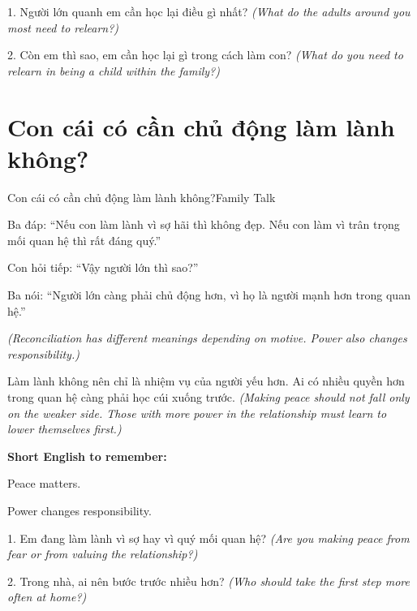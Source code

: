 \begin{tuhocnhanh}
1. Người lớn quanh em cần học lại điều gì nhất? \textit{(What do the adults around you most need to relearn?)}

2. Còn em thì sao, em cần học lại gì trong cách làm con? \textit{(What do you need to relearn in being a child within the family?)}
\end{tuhocnhanh}
\ngancach

\section{Con cái có cần chủ động làm lành không?}
\begin{truyen}{Con cái có cần chủ động làm lành không?}{Family Talk}

Ba đáp: ``Nếu con làm lành vì sợ hãi thì không đẹp. Nếu con làm vì trân trọng mối quan hệ thì rất đáng quý.''

Con hỏi tiếp: ``Vậy người lớn thì sao?''

Ba nói: ``Người lớn càng phải chủ động hơn, vì họ là người mạnh hơn trong quan hệ.''

\textit{(Reconciliation has different meanings depending on motive. Power also changes responsibility.)}
\end{truyen}

\begin{baihoc}
Làm lành không nên chỉ là nhiệm vụ của người yếu hơn. Ai có nhiều quyền hơn trong quan hệ càng phải học cúi xuống trước.
\textit{(Making peace should not fall only on the weaker side. Those with more power in the relationship must learn to lower themselves first.)}
\end{baihoc}

\begin{ghinhoanh}
\textbf{Short English to remember:}

Peace matters.

Power changes responsibility.
\end{ghinhoanh}

\begin{tuhocnhanh}
1. Em đang làm lành vì sợ hay vì quý mối quan hệ? \textit{(Are you making peace from fear or from valuing the relationship?)}

2. Trong nhà, ai nên bước trước nhiều hơn? \textit{(Who should take the first step more often at home?)}
\end{tuhocnhanh}
\ngancach

